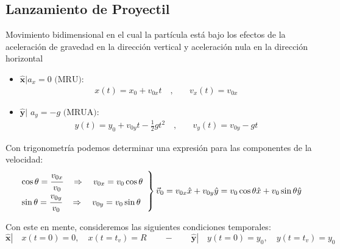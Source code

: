 \documentclass[letterpaper,11pt]{article}
\begin{document}
\subsection*{Lanzamiento de Proyectil}
Movimiento bidimensional en el cual la partícula está bajo los efectos de la aceleración de gravedad en la dirección vertical y aceleración nula en la dirección horizontal

\begin{minipage}{0.3\linewidth}
    \begin{figure}[H]
        \centering
        
    \end{figure}
\end{minipage}
\hfill
\begin{minipage}{0.65\linewidth}
    \begin{itemize}
        \item $\mathbf{\hat{x}}| a_x=0 \text{ (MRU): }$
        \begin{align*}
            x(t) = x_0 + v_{0x}t \quad, & \quad v_x(t) = v_{0x}
        \end{align*}

        \item $\mathbf{\hat{y}}|$ $a_y = -g \text{ (MRUA): }$
        \begin{align*}
            y(t) = y_0+v_{0y}t-\frac{1}{2}gt^2 \quad, & \quad v_y(t) = v_{0y} - gt
        \end{align*}
    \end{itemize}
\end{minipage}

\noindent Con trigonometría podemos determinar una expresión para las componentes de la velocidad:
\begin{align*}
    \left.
    \begin{array}{lr}
      \cos\theta = \cfrac{v_{0x}}{v_0} \quad \Rightarrow \quad v_{0x} = v_0 \cos\theta\\
      \sin\theta = \cfrac{v_{0y}}{v_0} \quad \Rightarrow \quad v_{0y} = v_0 \sin\theta
    \end{array}\right\} \vec{v}_0 = v_{0x}\hat{x} + v_{0y}\hat{y} = v_0\cos\theta\hat{x} + v_0\sin\theta\hat{y}
\end{align*}

\noindent Con este en mente, consideremos las siguientes condiciones temporales:
\[\mathbf{\hat{x}}| \hspace{1em} x(t=0) = 0 , \quad x(t=t_v)=R \qquad - \qquad \mathbf{\hat{y}}| \hspace{1em} y(t=0) = y_0 , \quad y(t=t_v)=y_0\]
\end{document}

